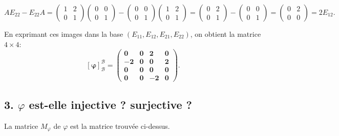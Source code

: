 \documentclass[french]{yLectureNote}
\begin{document}
$$AE_{22} - E_{22}A = \begin{pmatrix} 1 & 2 \\ 0 & 1 \end{pmatrix} \begin{pmatrix} 0 & 0 \\ 0 & 1 \end{pmatrix} - \begin{pmatrix} 0 & 0 \\ 0 & 1 \end{pmatrix} \begin{pmatrix} 1 & 2 \\ 0 & 1 \end{pmatrix} = \begin{pmatrix} 0 & 2 \\ 0 & 1 \end{pmatrix} - \begin{pmatrix} 0 & 0 \\ 0 & 1 \end{pmatrix} = \begin{pmatrix} 0 & 2 \\ 0 & 0 \end{pmatrix} = 2E_{12}.$$

En exprimant ces images dans la base $(E_{11}, E_{12}, E_{21}, E_{22})$, on obtient la matrice $4 \times 4$:
$$\mathbf{[\varphi]_{\mathcal{B}}^{\mathcal{B}} = \begin{pmatrix} 0 & 0 & 2 & 0 \\ -2 & 0 & 0 & 2 \\ 0 & 0 & 0 & 0 \\ 0 & 0 & -2 & 0 \end{pmatrix}.}$$

\subsection*{3. $\varphi$ est-elle injective ? surjective ?}
La matrice $M_{\varphi}$ de $\varphi$ est la matrice trouvée ci-dessus.
\end{document}
